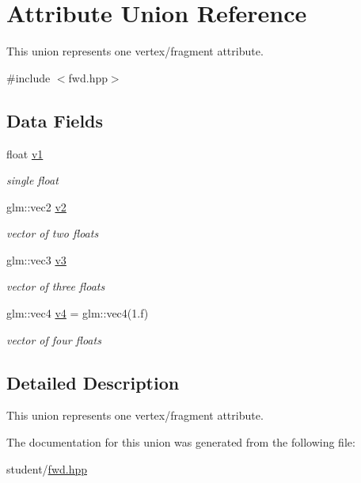 \hypertarget{unionAttribute}{}\section{Attribute Union Reference}
\label{unionAttribute}


This union represents one vertex/fragment attribute.  




{\ttfamily \#include $<$fwd.\+hpp$>$}

\subsection*{Data Fields}
\begin{DoxyCompactItemize}
\item 
\mbox{\label{unionAttribute_a2a9e03282539207b21a9b61596e6b72c}} 
float \hyperlink{unionAttribute_a2a9e03282539207b21a9b61596e6b72c}{v1}
\begin{DoxyCompactList}\small\item\em single float \end{DoxyCompactList}\item 
\mbox{\label{unionAttribute_aa240c263ec02c39b48d662a1c598e1fc}} 
glm\+::vec2 \hyperlink{unionAttribute_aa240c263ec02c39b48d662a1c598e1fc}{v2}
\begin{DoxyCompactList}\small\item\em vector of two floats \end{DoxyCompactList}\item 
\mbox{\label{unionAttribute_a7e4149eff36adcf056cb7153bfbf4c8c}} 
glm\+::vec3 \hyperlink{unionAttribute_a7e4149eff36adcf056cb7153bfbf4c8c}{v3}
\begin{DoxyCompactList}\small\item\em vector of three floats \end{DoxyCompactList}\item 
\mbox{\label{unionAttribute_ac47131c7c30814e28f0c4662a4ed2737}} 
glm\+::vec4 \hyperlink{unionAttribute_ac47131c7c30814e28f0c4662a4ed2737}{v4} = glm\+::vec4(1.f)
\begin{DoxyCompactList}\small\item\em vector of four floats \end{DoxyCompactList}\end{DoxyCompactItemize}


\subsection{Detailed Description}
This union represents one vertex/fragment attribute. 

The documentation for this union was generated from the following file\+:\begin{DoxyCompactItemize}
\item 
student/\hyperlink{fwd_8hpp}{fwd.\+hpp}\end{DoxyCompactItemize}
